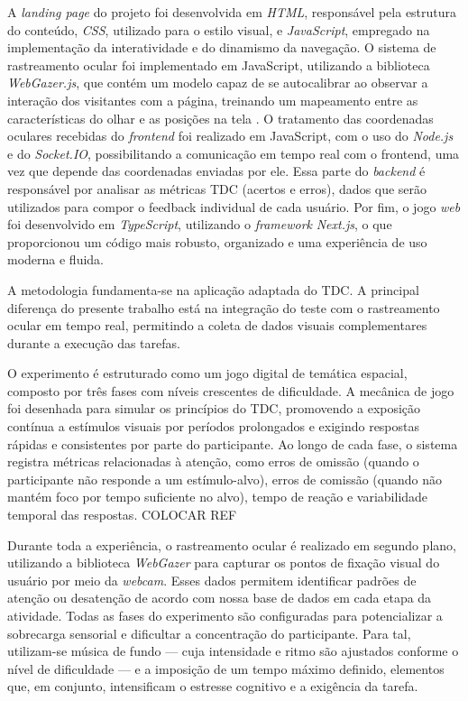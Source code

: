 A \textit{landing page} do projeto foi desenvolvida em \textit{HTML}, responsável pela estrutura do conteúdo, \textit{CSS}, utilizado para o estilo visual, e \textit{JavaScript}, empregado na implementação da interatividade e do dinamismo da navegação. O sistema de rastreamento ocular foi implementado em JavaScript, utilizando a biblioteca \textit{WebGazer.js}, que contém um modelo capaz de se autocalibrar ao observar a interação dos visitantes com a página, treinando um mapeamento entre as características do olhar e as posições na tela \cite{papoutsaki2016webgazer}. O tratamento das coordenadas oculares recebidas do \textit{frontend} foi realizado em JavaScript, com o uso do \textit{Node.js} e do \textit{Socket.IO}, possibilitando a comunicação em tempo real com o frontend, uma vez que depende das coordenadas enviadas por ele. Essa parte do \textit{backend} é responsável por analisar as métricas TDC (acertos e erros), dados que serão utilizados para compor o feedback individual de cada usuário. Por fim, o jogo \textit{web} foi desenvolvido em \textit{TypeScript}, utilizando o \textit{framework} \textit{Next.js}, o que proporcionou um código mais robusto, organizado e uma experiência de uso moderna e fluida.

A metodologia fundamenta-se na aplicação adaptada do TDC. A principal diferença do presente trabalho está na integração do teste com o rastreamento ocular em tempo real, permitindo a coleta de dados visuais complementares durante a execução das tarefas.

O experimento é estruturado como um jogo digital de temática espacial, composto por
três fases com níveis crescentes de dificuldade. A mecânica de jogo foi desenhada para simular os
princípios do TDC, promovendo a exposição contínua a estímulos visuais por períodos prolongados e exigindo respostas rápidas e consistentes por parte do participante. Ao longo de cada fase, o sistema registra métricas relacionadas à atenção, como erros de omissão (quando o participante não responde a um estímulo-alvo), erros de comissão (quando não mantém foco por tempo suficiente no alvo), tempo de reação e variabilidade temporal das respostas. COLOCAR REF

Durante toda a experiência, o rastreamento ocular é realizado em segundo plano, utilizando a biblioteca \textit{WebGazer} para capturar os pontos de fixação visual do usuário por meio da \textit{webcam}. Esses dados permitem identificar padrões de atenção ou desatenção de acordo com nossa base de dados em cada etapa da atividade. Todas as fases do experimento são configuradas para potencializar a sobrecarga sensorial e dificultar a concentração do participante. Para tal, utilizam-se música de fundo — cuja intensidade e ritmo são ajustados conforme o nível de dificuldade — e a imposição de um tempo máximo definido, elementos que, em conjunto, intensificam o estresse cognitivo e a exigência da tarefa.

